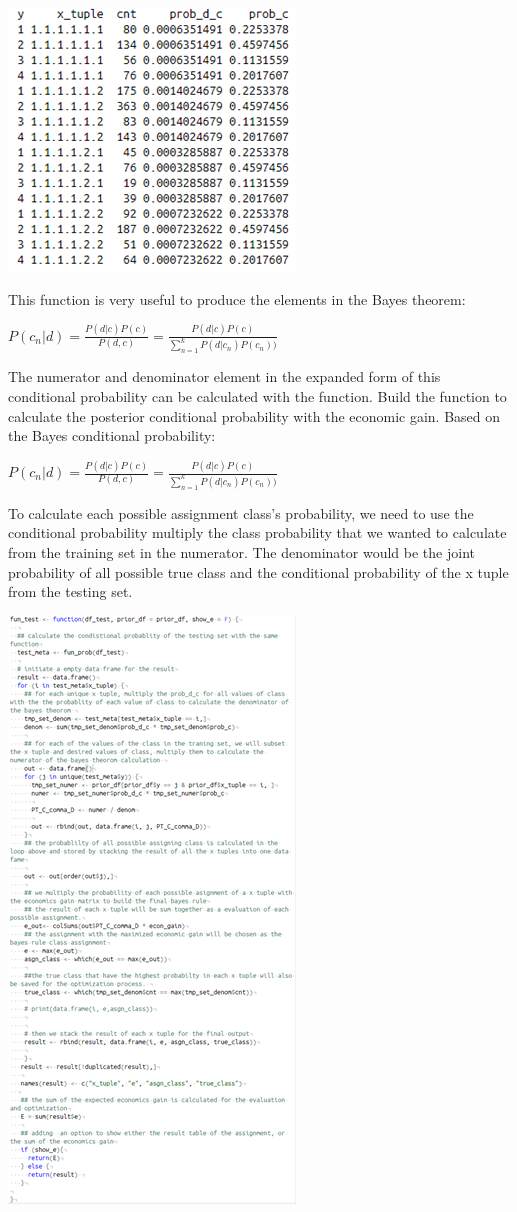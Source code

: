 \documentclass{article}
\begin{document}
\begin{multicols}{2}
\includegraphics{fig6.png}

This function is very useful to produce the elements in the Bayes theorem:

$P(c_n|d)= \frac{P(d | c)P(c)}{P(d,c)} = \frac{P(d | c)P(c)}{\sum_{n=1}^k P(d|c_n)P(c_n))}$

The numerator and denominator element in the expanded form of this conditional probability can be calculated with the function.
Build the function to calculate the posterior conditional probability with the economic gain.
Based on the Bayes conditional probability:

$P(c_n|d)= \frac{P(d | c)P(c)}{P(d,c)} = \frac{P(d | c)P(c)}{\sum_{n=1}^k P(d|c_n)P(c_n))}$

To calculate each possible assignment class's probability, we need to use the conditional probability multiply the class probability that we wanted to calculate from the training set in the numerator. The denominator would be the joint probability of all possible true class and the conditional probability of the x tuple from the testing set. 

\includegraphics{fig7.png}


\end{multicols}
\end{document}
